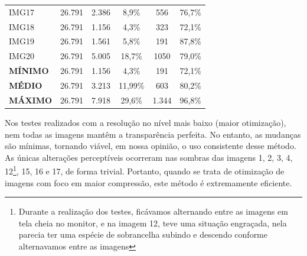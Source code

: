 \begin{table}[H]
\begin{tabularx}{\textwidth}{X|C|C|C|C|C}
        IMG17 & 26.791 & 2.386 & 8,9\% & 556 & 76,7\% \\ 
        IMG18 & 26.791 & 1.156 & 4,3\% & 323 & 72,1\% \\ 
        IMG19 & 26.791 & 1.561 & 5,8\% & 191 & 87,8\% \\ 
        IMG20 & 26.791 & 5.005 & 18,7\% & 1050 & 79,0\% \\ \hline
        \textbf{MÍNIMO} & 26.791 & 1.156 & 4,3\% & 191 & 72,1\% \\ 
        \textbf{MÉDIO} & 26.791 & 3.213 & 11,99\% & 603 & 80,2\% \\ 
        \textbf{MÁXIMO} & 26.791 & 7.918 & 29,6\% & 1.344 & 96,8\% \\ 
    \end{tabularx}

    \autoriaPropria
\end{table}

\paragrafo Nos testes realizados com a resolução no nível mais baixo (maior otimização), nem todas as imagens mantêm a transparência perfeita. No entanto, as mudanças são mínimas, tornando viável, em nossa opinião, o uso consistente desse método. As únicas alterações perceptíveis ocorreram nas sombras das imagens 1, 2, 3, 4, 12\footnote{Durante a realização dos testes, ficávamos alternando entre as imagens em tela cheia no monitor, e na imagem 12, teve uma situação engraçada, nela parecia ter uma espécie de sobrancelha subindo e descendo conforme alternavamos entre as imagens}, 15, 16 e 17, de forma trivial. Portanto, quando se trata de otimização de imagens com foco em maior compressão, este método é extremamente eficiente.
